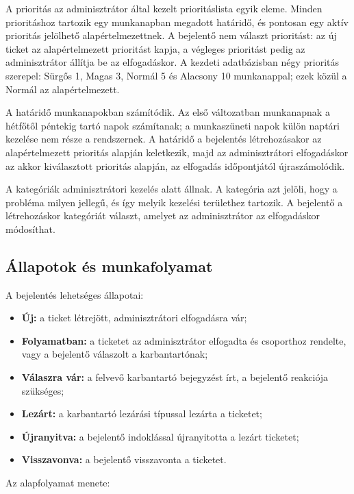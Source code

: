 \documentclass[12pt, a4paper, twoside]{article}
\begin{document}
A prioritás az adminisztrátor által kezelt prioritáslista egyik eleme. Minden prioritáshoz tartozik egy munkanapban megadott határidő, és pontosan egy aktív prioritás jelölhető alapértelmezettnek. A bejelentő nem választ prioritást: az új ticket az alapértelmezett prioritást kapja, a végleges prioritást pedig az adminisztrátor állítja be az elfogadáskor. A kezdeti adatbázisban négy prioritás szerepel: Sürgős 1, Magas 3, Normál 5 és Alacsony 10 munkanappal; ezek közül a Normál az alapértelmezett.

A határidő munkanapokban számítódik. Az első változatban munkanapnak a hétfőtől péntekig tartó napok számítanak; a munkaszüneti napok külön naptári kezelése nem része a rendszernek. A határidő a bejelentés létrehozásakor az alapértelmezett prioritás alapján keletkezik, majd az adminisztrátori elfogadáskor az akkor kiválasztott prioritás alapján, az elfogadás időpontjától újraszámolódik.

A kategóriák adminisztrátori kezelés alatt állnak. A kategória azt jelöli, hogy a probléma milyen jellegű, és így melyik kezelési területhez tartozik. A bejelentő a létrehozáskor kategóriát választ, amelyet az adminisztrátor az elfogadáskor módosíthat.

\subsection{Állapotok és munkafolyamat}
\label{sec:states}

A bejelentés lehetséges állapotai:

\begin{itemize}
    \item \textbf{Új:} a ticket létrejött, adminisztrátori elfogadásra vár;
    \item \textbf{Folyamatban:} a ticketet az adminisztrátor elfogadta és csoporthoz rendelte, vagy a bejelentő válaszolt a karbantartónak;
    \item \textbf{Válaszra vár:} a felvevő karbantartó bejegyzést írt, a bejelentő reakciója szükséges;
    \item \textbf{Lezárt:} a karbantartó lezárási típussal lezárta a ticketet;
    \item \textbf{Újranyitva:} a bejelentő indoklással újranyitotta a lezárt ticketet;
    \item \textbf{Visszavonva:} a bejelentő visszavonta a ticketet.
\end{itemize}

Az alapfolyamat menete:
\end{document}
